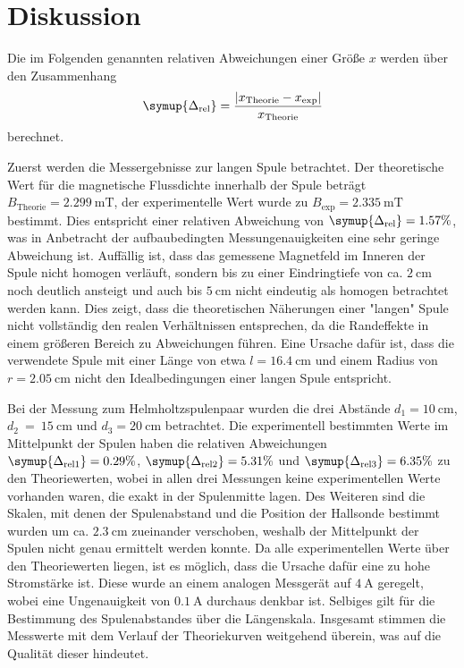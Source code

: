 \section{Diskussion}
\label{sec:Diskussion}
Die im Folgenden genannten relativen Abweichungen einer Größe $x$ werden über den Zusammenhang 
\begin{equation*}
    \symup{\Delta_{\text{rel}}} = \frac{\lvert x_{\text{Theorie}}- x_{\text{exp}}\rvert}{x_{\text{Theorie}}}
\end{equation*}
berechnet.


Zuerst werden die Messergebnisse zur langen Spule betrachtet. Der theoretische Wert für die magnetische Flussdichte innerhalb der Spule beträgt 
$B_{\text{Theorie}} = 2.299\:\unit{\milli\tesla}$, der experimentelle Wert wurde zu $B_{\text{exp}} = 2.335\:\unit{\milli\tesla}$ bestimmt. 
Dies entspricht einer relativen Abweichung von $\symup{\Delta_{\text{rel}}} = 1.57 \%$, was in Anbetracht der aufbaubedingten Messungenauigkeiten 
eine sehr geringe Abweichung ist. Auffällig ist, dass das gemessene Magnetfeld im Inneren der Spule nicht homogen verläuft, sondern bis zu einer Eindringtiefe von
ca. $2 \: \unit{\centi\metre}$ noch deutlich ansteigt und auch bis $5\: \unit{\centi\metre}$ nicht eindeutig als homogen betrachtet werden kann.
Dies zeigt, dass die theoretischen Näherungen einer "langen"\: Spule nicht vollständig den realen Verhältnissen entsprechen, da die Randeffekte in einem größeren
Bereich zu Abweichungen führen. Eine Ursache dafür ist, dass die verwendete Spule mit einer Länge von etwa $l = 16.4\: \unit{\centi\metre}$ und einem Radius von 
$r = 2.05 \: \unit{\centi\metre}$ nicht den Idealbedingungen einer langen Spule entspricht.


Bei der Messung zum Helmholtzspulenpaar wurden die drei Abstände $d_1 = 10\: \unit{\centi\metre}$, $d_2~=~15\: \unit{\centi\metre}$
und $d_3 = 20\: \unit{\centi\metre}$ betrachtet. Die experimentell bestimmten Werte im Mittelpunkt der Spulen haben die relativen Abweichungen 
$\symup{\Delta_{\text{rel}1}} = 0.29 \%$, $\symup{\Delta_{\text{rel}2}} = 5.31\%$ und $\symup{\Delta_{\text{rel}3}} = 6.35 \%$ zu den Theoriewerten, wobei in allen 
drei Messungen keine experimentellen Werte vorhanden waren, die exakt in der Spulenmitte lagen. Des Weiteren sind die Skalen, mit denen der Spulenabstand und die 
Position der Hallsonde bestimmt wurden um ca. $2.3\: \unit{\centi\metre}$ zueinander verschoben, weshalb der Mittelpunkt der Spulen nicht genau ermittelt werden konnte.
Da alle experimentellen Werte über den Theoriewerten liegen, ist es möglich, dass die Ursache dafür eine zu hohe Stromstärke ist. Diese wurde an einem
analogen Messgerät auf $4 \: \unit{\ampere}$ geregelt, wobei eine Ungenauigkeit von $0.1 \: \unit{\ampere}$ durchaus denkbar ist. Selbiges gilt für die Bestimmung des
Spulenabstandes über die Längenskala. Insgesamt stimmen die Messwerte mit dem Verlauf der Theoriekurven weitgehend überein, was auf die Qualität dieser hindeutet.


